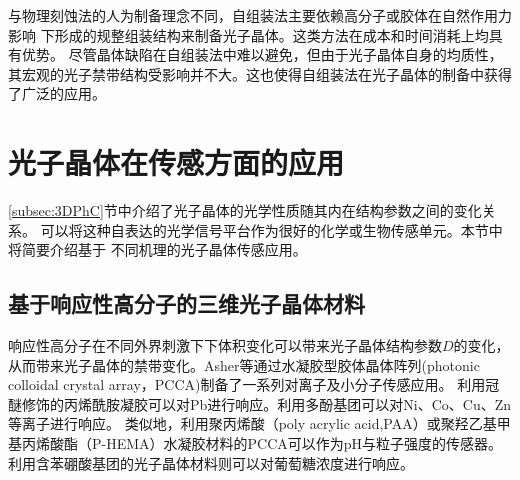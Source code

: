 与物理刻蚀法的人为制备理念不同，自组装法主要依赖高分子或胶体在自然作用力影响
下形成的规整组装结构来制备光子晶体。这类方法在成本和时间消耗上均具有优势。
尽管晶体缺陷在自组装法中难以避免，但由于光子晶体自身的均质性，
其宏观的光子禁带结构受影响并不大。这也使得自组装法在光子晶体的制备中获得了广泛的应用。

\section{光子晶体在传感方面的应用}
\label{sec:PhC-sensing}

\ref{subsec:3DPhC}节中介绍了光子晶体的光学性质随其内在结构参数之间的变化关系。
可以将这种自表达的光学信号平台作为很好的化学或生物传感单元。本节中将简要介绍基于
不同机理的光子晶体传感应用。

\subsection{基于响应性高分子的三维光子晶体材料}
\label{subsec:ion-response}
响应性高分子在不同外界刺激下下体积变化可以带来光子晶体结构参数$D$的变化，从而带来光子晶体的禁带变化。Asher等通过水凝胶型胶体晶体阵列(photonic colloidal crystal array，PCCA)制备了一系列对离子及小分子传感应用。
利用冠醚修饰的丙烯酰胺凝胶可以对Pb进行响应\cite{Reese2001Development}。利用多酚基团可以对Ni、Co、Cu、Zn等离子进行响应\cite{Asher2003Photonic}。
类似地，利用聚丙烯酸（poly acrylic acid,PAA）或聚羟乙基甲基丙烯酸酯（P-HEMA）水凝胶材料的PCCA可以作为pH与粒子强度的传感器\cite{Lee2000Photonic,Xu2008Polymerized}。
利用含苯硼酸基团的光子晶体材料则可以对葡萄糖浓度进行响应\cite{Honda2009Confined}。

